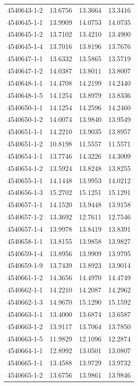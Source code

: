 \begin{longtable}{lrrr}
4540643-1-2 & 13.6756 & 13.3664 & 13.3416 \\
4540645-1-1 & 13.9909 & 14.0753 & 14.0735 \\
4540645-1-2 & 13.7102 & 13.4210 & 13.4900 \\
4540645-1-4 & 13.7016 & 13.8196 & 13.7676 \\
4540647-1-1 & 13.6332 & 13.5865 & 13.5719 \\
4540647-1-2 & 14.0387 & 13.8011 & 13.8007 \\
4540648-1-1 & 14.4708 & 14.2199 & 14.2440 \\
4540648-1-5 & 14.1254 & 13.8979 & 13.8336 \\
4540650-1-1 & 14.1254 & 14.2596 & 14.2460 \\
4540650-1-2 & 14.0074 & 13.9840 & 13.9549 \\
4540651-1-1 & 14.2210 & 13.9035 & 13.8957 \\
4540651-1-2 & 10.8198 & 11.5557 & 11.5571 \\
4540654-1-1 & 13.7746 & 14.3226 & 14.3009 \\
4540654-1-2 & 13.5924 & 13.8248 & 13.8255 \\
4540655-1-1 & 14.1448 & 13.9953 & 14.0212 \\
4540656-1-3 & 15.2702 & 15.1251 & 15.1291 \\
4540657-1-1 & 14.1520 & 13.9448 & 13.9158 \\
4540657-1-2 & 13.3692 & 12.7611 & 12.7546 \\
4540657-1-4 & 13.9978 & 13.8419 & 13.8391 \\
4540658-1-1 & 13.8155 & 13.9858 & 13.9827 \\
4540659-1-4 & 13.8956 & 13.9909 & 13.9795 \\
4540659-1-9 & 13.7439 & 13.8923 & 13.9014 \\
4540661-1-2 & 14.3656 & 14.4970 & 14.4749 \\
4540662-1-1 & 14.2210 & 14.2087 & 14.2962 \\
4540662-1-3 & 14.9670 & 15.1290 & 15.1592 \\
4540663-1-1 & 13.4000 & 13.6874 & 13.6587 \\
4540663-1-2 & 13.9117 & 13.7064 & 13.7850 \\
4540663-1-5 & 11.9829 & 12.1096 & 12.2874 \\
4540664-1-1 & 12.8992 & 13.0501 & 13.0807 \\
4540665-1-1 & 13.4588 & 13.9729 & 13.9732 \\
4540665-1-2 & 13.6756 & 13.9861 & 13.9846 \\

\end{longtable}
